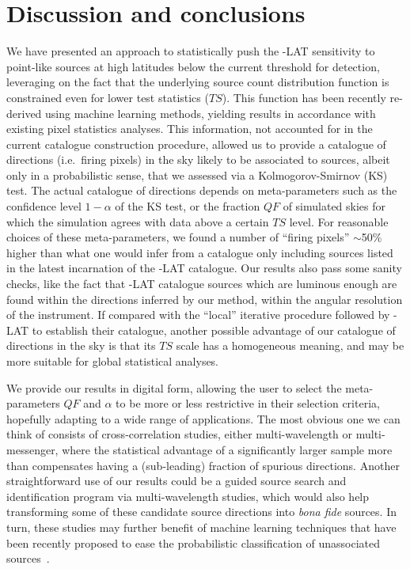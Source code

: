 \section{Discussion and conclusions}
\label{sec:conclusions}


We have presented an approach to statistically push the \Fermi-LAT sensitivity to point-like sources at high latitudes below  the current threshold for detection, leveraging on the fact that the underlying source count  distribution function is constrained even for lower test statistics ($TS$). This function has been recently re-derived using machine learning methods, yielding results in  accordance with existing pixel statistics analyses. This information, not accounted for in the current catalogue construction procedure, allowed us to provide a catalogue of directions (i.e.~firing pixels) in the sky likely to be associated to sources, albeit only in a probabilistic sense, that we assessed via a Kolmogorov-Smirnov (KS) test. The actual catalogue of directions depends on meta-parameters such as the confidence level $1-\alpha$ of the KS test, or the fraction $QF$ of simulated skies for which the simulation agrees with data above a certain $TS$ level. For reasonable choices of these meta-parameters, we found a number of ``firing pixels'' $\sim$50\%  higher than what one would infer from a catalogue only including sources listed in the latest incarnation of the \Fermi-LAT catalogue. Our results also pass some sanity checks, like the fact that \Fermi-LAT catalogue sources which are luminous enough are found within the directions inferred by our method, within the angular resolution of the instrument. If compared with the ``local'' iterative procedure followed by \Fermi-LAT to establish their catalogue, another possible advantage of our catalogue of directions in the sky is that its $TS$ scale has a homogeneous meaning, and may be more suitable for global statistical analyses.  

We provide our results in digital form, allowing the user to select the meta-parameters $QF$ and $\alpha$ to be more or less restrictive in their selection criteria, hopefully adapting to a wide range of applications. The most obvious one we can think of consists of cross-correlation studies, either multi-wavelength or multi-messenger, where the statistical advantage of  a significantly larger sample more than compensates having a (sub-leading) fraction of spurious directions. 
Another straightforward use of our results could be a guided source search and identification program via multi-wavelength studies, which would also help transforming some of these candidate source directions into  \textit{bona fide} sources. In turn, these studies may further benefit of machine learning techniques that have been recently proposed to ease the  probabilistic classification of unassociated sources~\cite{Bhat:2021wtb}.

